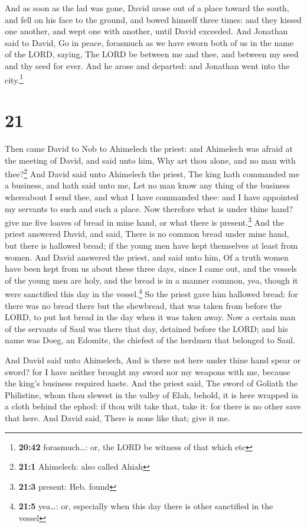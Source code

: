  And as soon as the lad was gone, David arose out of a
place toward the south, and fell on his face to the ground, and bowed
himself three times: and they kissed one another, and wept one with
another, until David exceeded.  And Jonathan said to
David, Go in peace, forasmuch as we have sworn both of us in the name of
the LORD, saying, The LORD be between me and thee, and between my seed
and thy seed for ever. And he arose and departed: and Jonathan went into
the city.\footnote{\textbf{20:42} forasmuch\ldots: or, the LORD be
  witness of that which etc}

\hypertarget{section-20}{%
\section{21}\label{section-20}}

 Then came David to Nob to Ahimelech the priest: and
Ahimelech was afraid at the meeting of David, and said unto him, Why art
thou alone, and no man with thee?\footnote{\textbf{21:1} Ahimelech: also
  called Ahiah}  And David said unto Ahimelech the priest,
The king hath commanded me a business, and hath said unto me, Let no man
know any thing of the business whereabout I send thee, and what I have
commanded thee: and I have appointed my servants to such and such a
place.  Now therefore what is under thine hand? give me
five loaves of bread in mine hand, or what there is present.\footnote{\textbf{21:3}
  present: Heb. found}  And the priest answered David, and
said, There is no common bread under mine hand, but there is hallowed
bread; if the young men have kept themselves at least from women.
 And David answered the priest, and said unto him, Of a
truth women have been kept from us about these three days, since I came
out, and the vessels of the young men are holy, and the bread is in a
manner common, yea, though it were sanctified this day in the
vessel.\footnote{\textbf{21:5} yea\ldots: or, especially when this day
  there is other sanctified in the vessel}  So the priest
gave him hallowed bread: for there was no bread there but the shewbread,
that was taken from before the LORD, to put hot bread in the day when it
was taken away.  Now a certain man of the servants of Saul
was there that day, detained before the LORD; and his name was Doeg, an
Edomite, the chiefest of the herdmen that belonged to Saul.

 And David said unto Ahimelech, And is there not here
under thine hand spear or sword? for I have neither brought my sword nor
my weapons with me, because the king's business required haste.
 And the priest said, The sword of Goliath the Philistine,
whom thou slewest in the valley of Elah, behold, it is here wrapped in a
cloth behind the ephod: if thou wilt take that, take it: for there is no
other save that here. And David said, There is none like that; give it
me.

